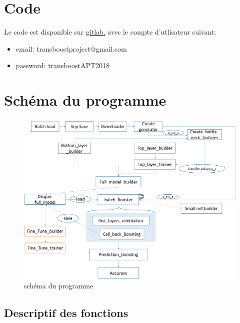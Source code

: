 \documentclass[11 pt]{article}
\begin{document}
\pagebreak
\begin{appendices}
  \section{Code}
    Le code est disponible sur \href{https://gitlab.com/zlanderous/transboost}{gitlab.} avec le compte d'utlisateur suivant:
    \begin{itemize}
    	\item email: transboostproject@gmail.com
        \item password: transboostAPT2018
    \end{itemize}

  \section{Schéma du programme}
  \begin{figure}[h]
    \includegraphics[width=\textwidth]{schema.png}
    \caption{schéma du programme}
    \label{figTot}
  \end{figure}
  
  \subsection*{Descriptif des fonctions}


\end{appendices}
\end{document}
